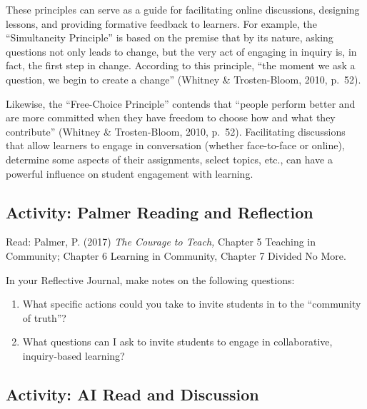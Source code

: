 \documentclass[
]{book}
\providecommand{\tightlist}{%
  \setlength{\itemsep}{0pt}\setlength{\parskip}{0pt}}
\begin{document}
These principles can serve as a guide for facilitating online discussions, designing lessons, and providing formative feedback to learners. For example, the ``Simultaneity Principle'' is based on the premise that by its nature, asking questions not only leads to change, but the very act of engaging in inquiry is, in fact, the first step in change. According to this principle, ``the moment we ask a question, we begin to create a change'' (Whitney \& Trosten-Bloom, 2010, p.~52).

Likewise, the ``Free-Choice Principle'' contends that ``people perform better and are more committed when they have freedom to choose how and what they contribute'' (Whitney \& Trosten-Bloom, 2010, p.~52). Facilitating discussions that allow learners to engage in conversation (whether face-to-face or online), determine some aspects of their assignments, select topics, etc., can have a powerful influence on student engagement with learning.

\hypertarget{activity-palmer-reading-and-reflection-1}{%
\subsection{Activity: Palmer Reading and Reflection}\label{activity-palmer-reading-and-reflection-1}}

\begin{reflect}
Read: Palmer, P. (2017) \emph{The Courage to Teach,} Chapter 5 Teaching
in Community; Chapter 6 Learning in Community, Chapter 7 Divided No
More.

In your Reflective Journal, make notes on the following questions:

\begin{enumerate}
\def\labelenumi{\arabic{enumi}.}
\tightlist
\item
  What specific actions could you take to invite students in to the
  ``community of truth''?
\item
  What questions can I ask to invite students to engage in
  collaborative, inquiry-based learning?
\end{enumerate}
\end{reflect}

\hypertarget{activity-ai-read-and-discussion}{%
\subsection{Activity: AI Read and Discussion}\label{activity-ai-read-and-discussion}}
\end{document}
